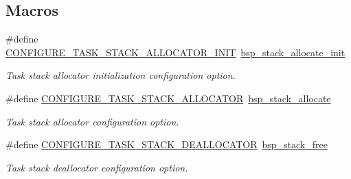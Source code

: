 \subsection*{Macros}
\begin{DoxyCompactItemize}
\item 
\mbox{\label{group__bsp__stack_ga6b97dad0691514ec4f93cfec0a35d791}} 
\#define \mbox{\hyperlink{group__bsp__stack_ga6b97dad0691514ec4f93cfec0a35d791}{C\+O\+N\+F\+I\+G\+U\+R\+E\+\_\+\+T\+A\+S\+K\+\_\+\+S\+T\+A\+C\+K\+\_\+\+A\+L\+L\+O\+C\+A\+T\+O\+R\+\_\+\+I\+N\+IT}}~\mbox{\hyperlink{group__bsp__stack_ga5525bfd94b2a806da939383fe0c2fde1}{bsp\+\_\+stack\+\_\+allocate\+\_\+init}}
\begin{DoxyCompactList}\small\item\em Task stack allocator initialization configuration option. \end{DoxyCompactList}\item 
\mbox{\label{group__bsp__stack_ga78aadbd6dc37d63e9a973832e76ef07b}} 
\#define \mbox{\hyperlink{group__bsp__stack_ga78aadbd6dc37d63e9a973832e76ef07b}{C\+O\+N\+F\+I\+G\+U\+R\+E\+\_\+\+T\+A\+S\+K\+\_\+\+S\+T\+A\+C\+K\+\_\+\+A\+L\+L\+O\+C\+A\+T\+OR}}~\mbox{\hyperlink{group__bsp__stack_ga223d4cdc3855e573987ecc66ddb9dacd}{bsp\+\_\+stack\+\_\+allocate}}
\begin{DoxyCompactList}\small\item\em Task stack allocator configuration option. \end{DoxyCompactList}\item 
\mbox{\label{group__bsp__stack_gad4b9c3c1b05e7ee120b8bc5782970cd0}} 
\#define \mbox{\hyperlink{group__bsp__stack_gad4b9c3c1b05e7ee120b8bc5782970cd0}{C\+O\+N\+F\+I\+G\+U\+R\+E\+\_\+\+T\+A\+S\+K\+\_\+\+S\+T\+A\+C\+K\+\_\+\+D\+E\+A\+L\+L\+O\+C\+A\+T\+OR}}~\mbox{\hyperlink{group__bsp__stack_ga6c8e965e98b6bd63769dd9679dd9afa5}{bsp\+\_\+stack\+\_\+free}}
\begin{DoxyCompactList}\small\item\em Task stack deallocator configuration option. \end{DoxyCompactList}\end{DoxyCompactItemize}
